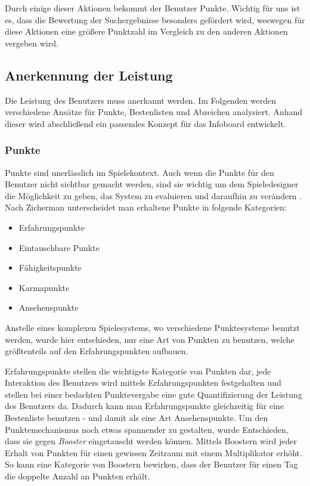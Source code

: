\documentclass[12pt,twoside]{book}
\begin{document}
Durch einige dieser Aktionen bekommt der Benutzer Punkte. Wichtig für uns ist es, dass die Bewertung der Suchergebnisse besonders gefördert wird, weswegen für diese Aktionen eine größere Punktzahl im Vergleich zu den anderen Aktionen vergeben wird.

\subsection{Anerkennung der Leistung}

Die Leistung des Benutzers muss anerkannt werden. Im Folgenden werden verschiedene Ansätze für Punkte, Bestenlisten und Abzeichen analysiert. Anhand dieser wird abschließend ein passendes Konzept für das Infoboard entwickelt.

\subsubsection*{Punkte}

Punkte sind unerlässlich im Spielekontext. Auch wenn die Punkte für den Benutzer nicht sichtbar gemacht werden, sind sie wichtig um dem Spieledesigner die Möglichkeit zu geben, das System zu evaluieren und daraufhin zu verändern \citep[pp. 36]{zichermann2011gamification}. Nach Zicherman \cite{zichermann2011gamification} unterscheidet man erhaltene Punkte in folgende Kategorien:

\begin{itemize}
	\item Erfahrungspunkte
    \item Eintauschbare Punkte
    \item Fähigkeitspunkte
    \item Karmapunkte
    \item Ansehenspunkte
\end{itemize}

Anstelle eines komplexen Spielesystems, wo verschiedene Punktesysteme benutzt werden, wurde hier entschieden, nur eine Art von Punkten zu benutzen, welche größtenteils auf den Erfahrungspunkten aufbauen.

Erfahrungspunkte stellen die wichtigste Kategorie von Punkten dar, jede Interaktion des Benutzers wird mittels Erfahrungspunkten festgehalten \citep[38 - 39]{zichermann2011gamification} und stellen bei einer bedachten Punktevergabe  eine gute Quantifizierung der Leistung des Benutzers da. Dadurch kann man Erfahrungspunkte gleichzeitig für eine Bestenliste benutzen - und damit als eine Art Ansehenspunkte. Um den Punktemechanismus noch etwas spannender zu gestalten, wurde Entschieden, dass sie gegen \textit{Booster} eingetauscht werden können. Mittels Boostern wird jeder Erhalt von Punkten für einen gewissen Zeitraum mit einem Multiplikator erhöht. So kann eine Kategorie von Boostern bewirken, dass der Benutzer für einen Tag die doppelte Anzahl an Punkten erhält.
\end{document}
